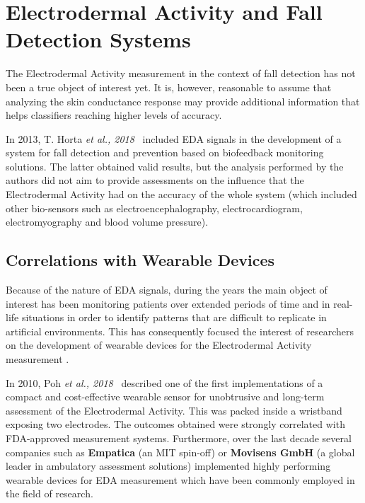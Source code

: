 \section{Electrodermal Activity and Fall Detection Systems}\label{sec:eda-fall-detection}

The Electrodermal Activity measurement in the context of fall detection has not been a true object of interest yet. It is, however, reasonable to assume that analyzing the skin conductance response may provide additional information that helps classifiers reaching higher levels of accuracy. 

In 2013, T. Horta \textit{et al., 2018}~\cite{eda-fall-detection} included EDA signals in the development of a system for fall detection and prevention based on biofeedback monitoring solutions. The latter obtained valid results, but the analysis performed by the authors did not aim to provide assessments on the influence that the Electrodermal Activity had on the accuracy of the whole system (which included other bio-sensors such as electroencephalography, electrocardiogram, electromyography and blood volume pressure).

\subsection{Correlations with Wearable Devices}\label{subsec:eda-wearables}

Because of the nature of EDA signals, during the years the main object of interest has been monitoring patients over extended periods of time and in real-life situations in order to identify patterns that are difficult to replicate in artificial environments. This has consequently focused the interest of researchers on the development of wearable devices for the Electrodermal Activity measurement \cite{poh-wearable}. 

In 2010, Poh \textit{et al., 2018}~\cite{poh-wearable} described one of the first implementations of a compact and cost-effective wearable sensor for unobtrusive and long-term assessment of the Electrodermal Activity. This was packed inside a wristband exposing two electrodes. The outcomes obtained were strongly correlated with FDA-approved measurement systems. Furthermore, over the last decade several companies such as \textbf{Empatica} (an MIT spin-off) or \textbf{Movisens GmbH} (a global leader in ambulatory assessment solutions) implemented highly performing wearable devices for EDA measurement which have been commonly employed in the field of research.

